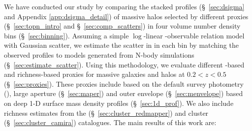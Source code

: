 \documentclass[fleqn,usenatbib,useAMS]{mnras}
\begin{document}
    We have conducted our study by comparing the stacked \dsigma{} profiles (\S\ \ref{sec:dsigma}
    and Appendix \ref{app:dsigma_detail}) of massive halos selected by different \mvir{} proxies
    (\S\ \ref{sec:topn_intro} and \S\ \ref{sec:comp_scatters}) in four volume number density bins
    (\S\ \ref{sec:binning}).
    Assuming a simple $\log$-linear \mvir{}-observable relation model with Gaussian scatter, we
    estimate the scatter in \mvir{} in each bin by matching the observed \dsigma{} profiles to
    models generated from N-body simulations (\S\ \ref{sec:estimate_scatter}).
    Using this \topn{} methodology, we evaluate different \mstar{}-based and richness-based \mvir{}
    proxies for massive galaxies and halos at $0.2 < z < 0.5$ (\S\ \ref{sec:proxies}).
    These proxies include \mstar{} based on the default survey photometry (\cmodel{}), large
    aperture \mstar{} (\S\ \ref{sec:maper}) and outer envelope \mstar{} (\S\ \ref{sec:menvelope})
    based on deep 1-D surface mass density profiles (\S\ \ref{sec:1d_prof}).
    We also include richness estimates from the \redm{} (\S\ \ref{sec:cluster_redmapper}) and
    \camira{} cluster (\S\ \ref{sec:cluster_camira}) catalogues.
    The main results of this work are:
    
\end{document}

